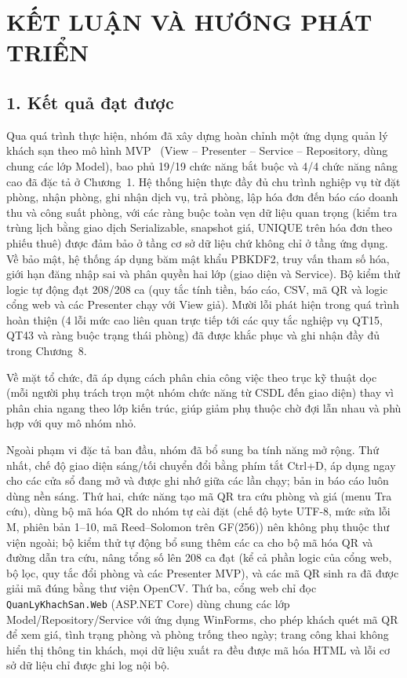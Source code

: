 \documentclass[14pt]{report}
\newcommand{\TieuDeDau}[1]{\markboth{#1}{#1}}
\begin{document}


\chapter*{KẾT LUẬN VÀ HƯỚNG PHÁT TRIỂN}
\TieuDeDau{KẾT LUẬN VÀ HƯỚNG PHÁT TRIỂN}
\section*{1. Kết quả đạt được}

Qua quá trình thực hiện, nhóm đã xây dựng hoàn chỉnh một ứng dụng quản lý khách sạn theo mô hình MVP~\cite{potel} (View -- Presenter -- Service -- Repository, dùng chung các lớp Model), bao phủ 19/19 chức năng bắt buộc và 4/4 chức năng nâng cao đã đặc tả ở Chương~1. Hệ thống hiện thực đầy đủ chu trình nghiệp vụ từ đặt phòng, nhận phòng, ghi nhận dịch vụ, trả phòng, lập hóa đơn đến báo cáo doanh thu và công suất phòng, với các ràng buộc toàn vẹn dữ liệu quan trọng (kiểm tra trùng lịch bằng giao dịch Serializable, snapshot giá, UNIQUE trên hóa đơn theo phiếu thuê) được đảm bảo ở tầng cơ sở dữ liệu chứ không chỉ ở tầng ứng dụng. Về bảo mật, hệ thống áp dụng băm mật khẩu PBKDF2, truy vấn tham số hóa, giới hạn đăng nhập sai và phân quyền hai lớp (giao diện và Service). Bộ kiểm thử logic tự động đạt 208/208 ca (quy tắc tính tiền, báo cáo, CSV, mã QR và logic cổng web và các Presenter chạy với View giả). Mười lỗi phát hiện trong quá trình hoàn thiện (4 lỗi mức cao liên quan trực tiếp tới các quy tắc nghiệp vụ QT15, QT43 và ràng buộc trạng thái phòng) đã được khắc phục và ghi nhận đầy đủ trong Chương~8.

Về mặt tổ chức,  đã áp dụng cách phân chia công việc theo trục kỹ thuật dọc (mỗi người phụ trách trọn một nhóm chức năng từ CSDL đến giao diện) thay vì phân chia ngang theo lớp kiến trúc, giúp giảm phụ thuộc chờ đợi lẫn nhau và phù hợp với quy mô nhóm nhỏ.

Ngoài phạm vi đặc tả ban đầu, nhóm đã bổ sung ba tính năng mở rộng. Thứ nhất, chế độ giao diện sáng/tối chuyển đổi bằng phím tắt Ctrl+D, áp dụng ngay cho các cửa sổ đang mở và được ghi nhớ giữa các lần chạy; bản in báo cáo luôn dùng nền sáng. Thứ hai, chức năng tạo mã QR tra cứu phòng và giá (menu Tra cứu), dùng bộ mã hóa QR do nhóm tự cài đặt (chế độ byte UTF-8, mức sửa lỗi M, phiên bản 1--10, mã Reed--Solomon trên GF(256)) nên không phụ thuộc thư viện ngoài; bộ kiểm thử tự động bổ sung thêm các ca cho bộ mã hóa QR và đường dẫn tra cứu, nâng tổng số lên 208 ca đạt (kể cả phần logic của cổng web, bộ lọc, quy tắc đổi phòng và các Presenter MVP), và các mã QR sinh ra đã được giải mã đúng bằng thư viện OpenCV. Thứ ba, cổng web chỉ đọc \texttt{QuanLyKhachSan.Web} (ASP.NET Core) dùng chung các lớp Model/Repository/Service với ứng dụng WinForms, cho phép khách quét mã QR để xem giá, tình trạng phòng và phòng trống theo ngày; trang công khai không hiển thị thông tin khách, mọi dữ liệu xuất ra đều được mã hóa HTML và lỗi cơ sở dữ liệu chỉ được ghi log nội bộ.
\end{document}
